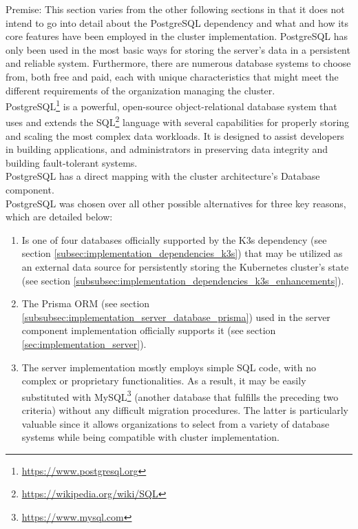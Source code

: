 Premise: This section varies from the other following sections in that it does not
intend to go into detail about the PostgreSQL dependency and what and how its core
features have been employed in the cluster implementation. PostgreSQL has only
been used in the most basic ways for storing the server's data in a persistent
and reliable system. Furthermore, there are numerous database systems to choose
from, both free and paid, each with unique characteristics that might meet the
different requirements of the organization managing the cluster. \\ %

PostgreSQL\footnote{\url{https://www.postgresql.org}} is a powerful, open-source
object-relational database system that uses and extends the SQL\footnote{\url{https://wikipedia.org/wiki/SQL}}
language with several capabilities for properly storing and scaling the most
complex data workloads. It is designed to assist developers in building applications,
and administrators in preserving data integrity and building fault-tolerant
systems\cite{postgresql}. \\ %
PostgreSQL has a direct mapping with the cluster architecture's Database component.
\\ %
PostgreSQL was chosen over all other possible alternatives for three key reasons,
which are detailed below:
\begin{enumerate}
  \item Is one of four databases officially supported by the K3s dependency (see
    section \ref{subsec:implementation_dependencies_k3s}) that may be utilized as
    an external data source for persistently storing the Kubernetes cluster's state
    (see section \ref{subsubsec:implementation_dependencies_k3s_enhancements}).

  \item The Prisma ORM (see section
    \ref{subsubsec:implementation_server_database_prisma}) used in the server component
    implementation officially supports it (see section
    \ref{sec:implementation_server}).

  \item The server implementation mostly employs simple SQL code, with no
    complex or proprietary functionalities. As a result, it may be easily
    substituted with MySQL\footnote{\url{https://www.mysql.com}} (another database
    that fulfills the preceding two criteria) without any difficult migration
    procedures. The latter is particularly valuable since it allows organizations
    to select from a variety of database systems while being compatible with cluster
    implementation.
\end{enumerate}

